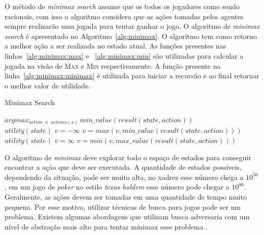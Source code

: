 O método de \textit{minimax search} assume que os todos os jogadores como sendo racionais, com isso o algoritmo considera que as ações tomadas pelos agentes sempre realizarão uma jogada para tentar ganhar o jogo. O algoritmo de \textit{minimax search} é apresentado no Algoritmo~\ref{alg:minimax}. O algoritmo tem como retorno a melhor ação a ser realizada no estado atual. As funções presentes nas linhas~\ref{alg:minimax:max} e ~\ref{alg:minimax:min} são utilizadas para calcular a jogada na visão de \textsc{Max} e \textsc{Min} respectivamente.
A função presente na linha~\ref{alg:minimax:minimax} é utilizada para iniciar a recursão e ao final retornar o melhor valor de utilidade.

\begin{algorithm}
	\caption{Minimax Search}
	\label{alg:minimax}
	\begin{algorithmic}[1]	
		 \label{alg:minimax:minimax}
		\State \Return $arg max_{action~ \in~ actions(s)}~ min\_value(result(state,  action)) $
		\EndFunction \\
		\label{alg:minimax:max}
		\State	\Return $utility(state)$
		\EndIf
		\State $v = -\infty$
		\State $v = max(v, min\_value(result(state,action)))$
		\EndFor	
		\EndFunction \\
		\label{alg:minimax:min}
		\State	\Return $utility(state)$
		\EndIf
		\State $v = \infty$
		\State $v = min(v, max\_value(result(state,action)))$
		\EndFor	
		\EndFunction
	\end{algorithmic}
\end{algorithm}

O algoritmo de \textit{minimax} deve explorar todo o espaço de estados para conseguir encontrar a ação que deve ser executada. A quantidade de estados possíveis, dependendo da situação, pode ser muito alta, no xadrez esse número chega a $10^{50}$, em um jogo de \textit{poker} no estilo \textit{texas holdem} esse número pode chegar a $10^{80}$. Geralmente, as ações devem ser tomadas em uma quantidade de tempo muito pequena. Por esse motivo, utilizar técnicas de busca para jogos pode ser um problema. Existem algumas abordagens que utilizam busca adversaria com um nível de abstração mais alto para tentar minimax esse problema \cite{ontanon2013survey}.  

